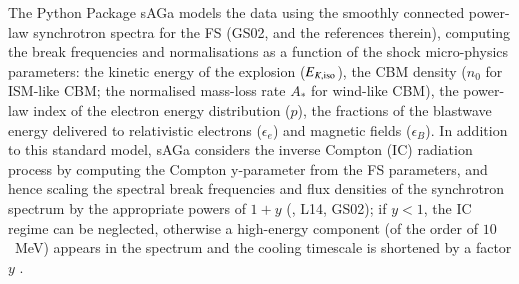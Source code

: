 \documentclass{aa}
\begin{document}
The Python Package {\sc sAGa} models the data using the smoothly connected power-law synchrotron spectra for the FS (GS02, and the references therein), computing the break frequencies and normalisations as a function of the shock micro-physics parameters: the kinetic energy of the explosion ($E_{K,{\rm iso}}$), the CBM density ($n_0$ for ISM-like CBM; the normalised mass-loss rate $A_*$ for wind-like CBM), the power-law index of the electron energy distribution ($p$), the fractions of the blastwave energy delivered to relativistic electrons ($\epsilon_e$) and magnetic fields ($\epsilon_B$).
In addition to this standard model, {\sc sAGa} considers the inverse Compton (IC) radiation process by computing the Compton y-parameter from the FS parameters, and hence scaling the spectral break frequencies and flux densities of the synchrotron spectrum by the appropriate powers of $1 + y$ (\citealt{Sari01,Zhang07}, L14, GS02); if $y < 1$, the IC regime can be neglected, otherwise a high-energy component (of the order of $10$~MeV) appears in the spectrum and the cooling timescale is shortened by a factor $y$ \citep{Sari01,Piran04_rev}.
%
\end{document}
